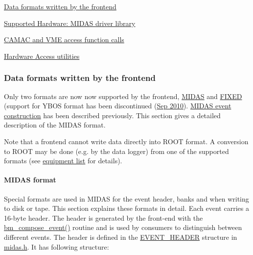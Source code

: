  \par
 \par


\par



\begin{DoxyItemize}
\item \hyperlink{FE_Data_format}{Data formats written by the frontend}
\item \hyperlink{FE_Hardware}{Supported Hardware: MIDAS driver library}
\item \hyperlink{FE_camac_vme_function_calls}{CAMAC and VME access function calls}
\item \hyperlink{FE_utils}{Hardware Access utilities} \label{index_end}
\hypertarget{index_end}{}
 
\end{DoxyItemize}\subsubsection{Data formats written by the frontend}\label{FE_Data_format}
\par




\par
 \par
 \label{FE_Data_format_idx_format_frontend}
\hypertarget{FE_Data_format_idx_format_frontend}{}
 Only two formats are now now supported by the frontend, \hyperlink{FE_Data_format_FE_Midas_format}{MIDAS} and \hyperlink{FE_bank_construction_FE_FIXED_event_readout}{FIXED} (support for YBOS format has been discontinued (\hyperlink{NDF_ndf_sep_2010}{Sep 2010}). \hyperlink{FE_bank_construction_FE_MIDAS_event_construction}{MIDAS event construction} has been described previously. This section gives a detailed description of the MIDAS format.

Note that a frontend cannot write data directly into ROOT format. A conversion to ROOT may be done (e.g. by the data logger) from one of the supported formats (see \hyperlink{FE_table_FE_tbl_Format}{equipment list} for details).

\label{FE_Data_format_idx_format_MIDAS}
\hypertarget{FE_Data_format_idx_format_MIDAS}{}
 \label{FE_Data_format_idx_Midas_format}
\hypertarget{FE_Data_format_idx_Midas_format}{}
 \label{FE_Data_format_Midas_format}
\hypertarget{FE_Data_format_Midas_format}{}
 

 \hypertarget{FE_Data_format_FE_Midas_format}{}\paragraph{MIDAS format}\label{FE_Data_format_FE_Midas_format}
Special formats are used in MIDAS for the event header, banks and when writing to disk or tape. This section explains these formats in detail. Each event carries a 16-\/byte header. The header is generated by the front-\/end with the \hyperlink{group__bmfunctionc_gac5e3e469fb6721a502ebd80a35a328f5}{bm\_\-compose\_\-event()} routine and is used by consumers to distinguish between different events. The header is defined in the \hyperlink{structEVENT__HEADER}{EVENT\_\-HEADER} structure in \hyperlink{midas_8h}{midas.h}. It has following structure:

